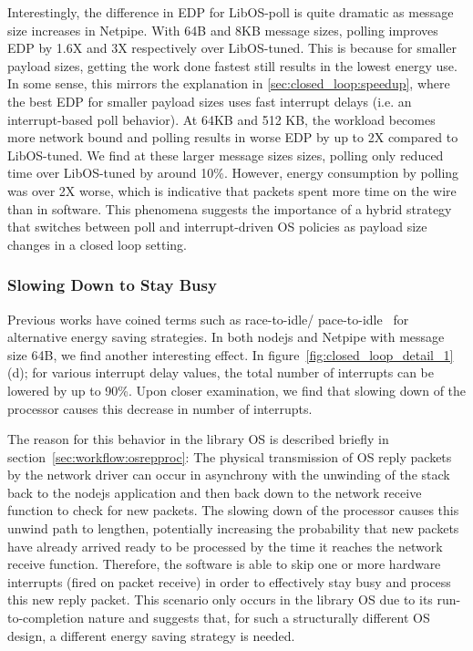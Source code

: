 Interestingly, the difference in EDP for LibOS-poll is quite dramatic as message size increases in Netpipe. With 64B and 8KB message sizes, polling improves EDP by 1.6X and 3X respectively over LibOS-tuned. This is because for smaller payload sizes, getting the work done fastest still results in the lowest energy use.
In some sense, this mirrors the explanation in \cref{sec:closed_loop:speedup}, where the best EDP for smaller payload sizes uses fast interrupt delays (i.e. an interrupt-based poll behavior). At 64KB and 512 KB, the workload becomes more network bound and polling results in worse EDP by up to 2X compared to LibOS-tuned. We find at these larger message sizes sizes, polling only reduced time over LibOS-tuned by around 10\%.
However, energy consumption by polling was over 2X worse, which is indicative that packets spent more time on the wire than in software.
This phenomena suggests the importance of a hybrid strategy that switches between poll and interrupt-driven OS policies as payload size changes in a closed loop setting.

\subsubsection{Slowing Down to Stay Busy}
\label{sec:closed_loop:slowtostaybusy}
Previous works have coined terms such as race-to-idle/ pace-to-idle~\cite{10.1145/2525526.2525854} for alternative energy saving strategies. In both nodejs and Netpipe with message size 64B, we find another interesting effect. In figure~\ref{fig:closed_loop_detail_1}(d); for various interrupt delay values, the total number of interrupts can be lowered by up to 90\%.
Upon closer examination, we find that slowing down of the processor causes this decrease in number of interrupts.

The reason for this behavior in the library OS is described briefly in section~\ref{sec:workflow:osrepproc}:
The physical transmission of OS reply packets by the network driver can occur in asynchrony with the unwinding of the stack back to the nodejs application and then back down to the network receive function to check for new packets.
The slowing down of the processor causes this unwind path to lengthen, potentially increasing the probability that new packets have already arrived ready to be processed by the time it reaches the network receive function.
Therefore, the software is able to skip one or more hardware interrupts (fired on packet receive) in order to effectively stay busy and process this new reply packet.
This scenario only occurs in the library OS due to its run-to-completion nature and suggests that, for such a structurally different OS design, a different energy saving strategy is needed.

